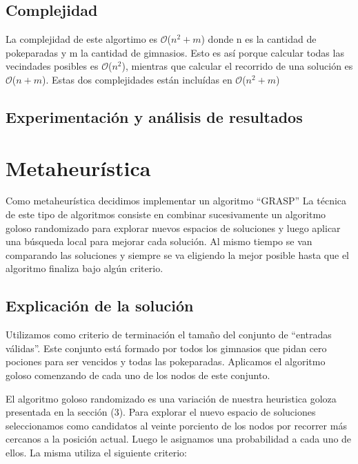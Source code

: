 \documentclass[spanish,12pt]{article}
\begin{document}
\subsection{Complejidad}
La complejidad de este algortimo es $\mathcal{O}$($n^{2}+m$) donde n es la cantidad de pokeparadas y m la cantidad de gimnasios. Esto es así porque calcular todas las vecindades posibles es $\mathcal{O}$($n^{2}$), mientras que calcular el recorrido de una solución es $\mathcal{O}$($n+m$). Estas dos complejidades están incluídas en $\mathcal{O}$($n^{2}+m$)

\subsection{Experimentación y análisis de resultados}



\section{Metaheurística}

Como metaheurística decidimos implementar un algoritmo ``GRASP''
La técnica de este tipo de algoritmos consiste en combinar sucesivamente un algoritmo goloso randomizado para explorar nuevos espacios de soluciones y luego aplicar una búsqueda local para mejorar cada solución. Al mismo tiempo se van comparando las soluciones y siempre se va eligiendo la mejor posible hasta que el algoritmo finaliza bajo algún criterio.

\subsection{Explicación de la solución}

Utilizamos como criterio de terminación el tamaño del conjunto de ``entradas válidas''. Este conjunto está formado por todos los gimnasios que pidan cero pociones para ser vencidos y todas las pokeparadas. Aplicamos el algoritmo goloso comenzando de cada uno de los nodos de este conjunto. 

El algoritmo goloso randomizado es una variación de nuestra heuristica goloza presentada en la sección (3). %
Para explorar el nuevo espacio de soluciones seleccionamos como candidatos al veinte porciento de los nodos por recorrer más cercanos a la posición actual.
Luego le asignamos una probabilidad a cada uno de ellos. La misma utiliza el siguiente criterio:
\end{document}

